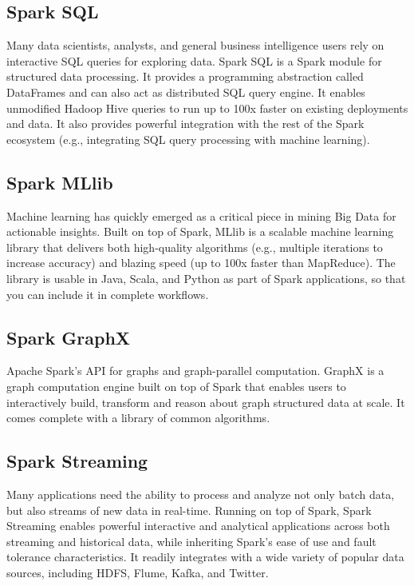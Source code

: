 \subsection{Spark SQL}
Many data scientists, analysts, and general business intelligence users rely on interactive SQL queries for exploring data. Spark SQL is a Spark module for structured data processing. It provides a programming abstraction called DataFrames and can also act as distributed SQL query engine. It enables unmodified Hadoop Hive queries to run up to 100x faster on existing deployments and data. It also provides powerful integration with the rest of the Spark ecosystem (e.g., integrating SQL query processing with machine learning).\autocite{databricks2023}

\subsection{Spark MLlib}
Machine learning has quickly emerged as a critical piece in mining Big Data for actionable insights. Built on top of Spark, MLlib is a scalable machine learning library that delivers both high-quality algorithms (e.g., multiple iterations to increase accuracy) and blazing speed (up to 100x faster than MapReduce). The library is usable in Java, Scala, and Python as part of Spark applications, so that you can include it in complete workflows.

\subsection{Spark GraphX}
Apache Spark's API for graphs and graph-parallel computation.
GraphX is a graph computation engine built on top of Spark that enables users to interactively build, transform and reason about graph structured data at scale. It comes complete with a library of common algorithms.\autocite{databricks2023}

\subsection{Spark Streaming}
Many applications need the ability to process and analyze not only batch data, but also streams of new data in real-time. Running on top of Spark, Spark Streaming enables powerful interactive and analytical applications across both streaming and historical data, while inheriting Spark’s ease of use and fault tolerance characteristics. It readily integrates with a wide variety of popular data sources, including HDFS, Flume, Kafka, and Twitter.\autocite{databricks2023}


